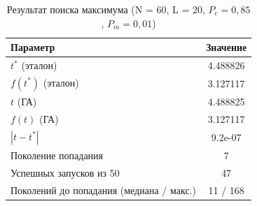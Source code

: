 \begin{table}[H]
\caption{Результат поиска максимума (N = 60, L = 20, $P_c = 0{,}85$, $P_m = 0{,}01$)}
\label{tab:result}
\centering
\small
\begin{tabular}{lc}
\toprule
Параметр & Значение \\
\midrule
$t^*$ (эталон) & 4.488826 \\
$f(t^*)$ (эталон) & 3.127117 \\
$t$ (ГА) & 4.488825 \\
$f(t)$ (ГА) & 3.127117 \\
$|t - t^*|$ & 9.2e-07 \\
Поколение попадания & 7 \\
Успешных запусков из 50 & 47 \\
Поколений до попадания (медиана / макс.) & 11 / 168 \\
\bottomrule
\end{tabular}
\end{table}
